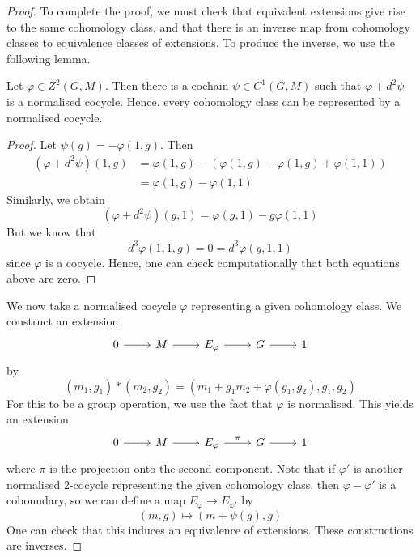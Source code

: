 \begin{proof}
    To complete the proof, we must check that equivalent extensions give rise to the same cohomology class, and that there is an inverse map from cohomology classes to equivalence classes of extensions.
    To produce the inverse, we use the following lemma.
    \begin{lemma}
        Let \( \varphi \in Z^2(G, M) \).
        Then there is a cochain \( \psi \in C^1(G, M) \) such that \( \varphi + d^2 \psi \) is a normalised cocycle.
        Hence, every cohomology class can be represented by a normalised cocycle.
    \end{lemma}
    \begin{proof}
        Let \( \psi(g) = -\varphi(1, g) \).
        Then
        \begin{align*}
            (\varphi + d^2 \psi)(1, g) &= \varphi(1, g) - (\varphi(1, g) - \varphi(1, g) + \varphi(1, 1)) \\
            &= \varphi(1, g) - \varphi(1, 1)
        \end{align*}
        Similarly, we obtain
        \[ (\varphi + d^2 \psi)(g, 1) = \varphi(g, 1) - g\varphi(1, 1) \]
        But we know that
        \[ d^3\varphi(1, 1, g) = 0 = d^3\varphi(g, 1, 1) \]
        since \( \varphi \) is a cocycle.
        Hence, one can check computationally that both equations above are zero.
    \end{proof}
    We now take a normalised cocycle \( \varphi \) representing a given cohomology class.
    We construct an extension
\[\begin{tikzcd}
	0 & M & {E_\varphi} & G & 1
	\arrow[from=1-1, to=1-2]
	\arrow[from=1-2, to=1-3]
	\arrow[from=1-3, to=1-4]
	\arrow[from=1-4, to=1-5]
\end{tikzcd}\]
    by
    \[ (m_1, g_1) \ast (m_2, g_2) = (m_1 + g_1 m_2 + \varphi(g_1, g_2), g_1, g_2) \]
    For this to be a group operation, we use the fact that \( \varphi \) is normalised.
    This yields an extension
\[\begin{tikzcd}
	0 & M & {E_\varphi} & G & 1
	\arrow[from=1-1, to=1-2]
	\arrow[from=1-2, to=1-3]
	\arrow["\pi", from=1-3, to=1-4]
	\arrow[from=1-4, to=1-5]
\end{tikzcd}\]
    where \( \pi \) is the projection onto the second component.
    Note that if \( \varphi' \) is another normalised 2-cocycle representing the given cohomology class, then \( \varphi - \varphi' \) is a coboundary, so we can define a map \( E_\varphi \to E_{\varphi'} \) by
    \[ (m, g) \mapsto (m + \psi(g), g) \]
    One can check that this induces an equivalence of extensions.
    These constructions are inverses.
\end{proof}

